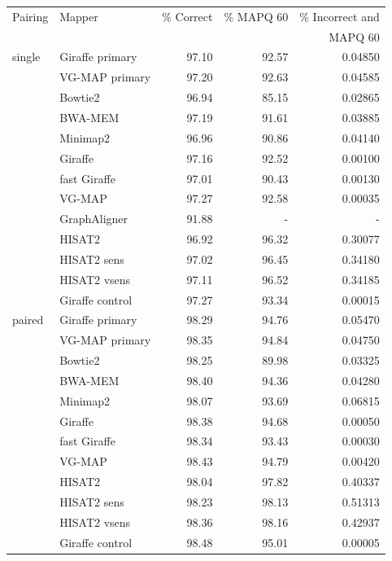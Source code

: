 \documentclass[11pt]{ucscthesis}
\begin{document}
\begin{table}[H]
    \centering
    \begin{tabular}{|l|l|r|r|r|}
    \hline
        Pairing & Mapper & \% Correct & \% MAPQ 60 & \% Incorrect and \\
               &         &            &            & MAPQ 60          \\
        \hline
        single  & Giraffe primary	& 97.10     & 92.57     & 0.04850 \\
                & VG-MAP primary   	& 97.20     & 92.63     & 0.04585 \\
                & Bowtie2       	& 96.94     & 85.15     & 0.02865 \\
                & BWA-MEM       	& 97.19     & 91.61     & 0.03885 \\
                & Minimap2	        & 96.96     & 90.86     & 0.04140 \\
                & Giraffe	        & 97.16     & 92.52     & 0.00100 \\
                & fast Giraffe  	& 97.01     & 90.43     & 0.00130 \\
                & VG-MAP	        & 97.27     & 92.58     & 0.00035 \\
                & GraphAligner   	& 91.88     & -         & - \\
                & HISAT2	        & 96.92     & 96.32     & 0.30077 \\
                & HISAT2 sens   	& 97.02     & 96.45     & 0.34180 \\
                & HISAT2 vsens	    & 97.11     & 96.52     & 0.34185 \\
                & Giraffe control	& 97.27     & 93.34     & 0.00015 \\

        \hline
        paired  & Giraffe primary	& 98.29     & 94.76     & 0.05470 \\
                & VG-MAP primary   	& 98.35     & 94.84     & 0.04750 \\
                & Bowtie2       	& 98.25     & 89.98     & 0.03325 \\
                & BWA-MEM        	& 98.40     & 94.36     & 0.04280 \\
                & Minimap2      	& 98.07     & 93.69     & 0.06815 \\
                & Giraffe	        & 98.38     & 94.68     & 0.00050 \\
                & fast Giraffe	    & 98.34     & 93.43     & 0.00030 \\
                & VG-MAP           	& 98.43     & 94.79     & 0.00420 \\
                & HISAT2	        & 98.04     & 97.82     & 0.40337 \\
                & HISAT2 sens   	& 98.23     & 98.13     & 0.51313 \\
                & HISAT2 vsens	    & 98.36     & 98.16     & 0.42937 \\
                & Giraffe control	& 98.48     & 95.01     & 0.00005 \\
        \hline
        

\end{tabular}
\end{table}
\end{document}
